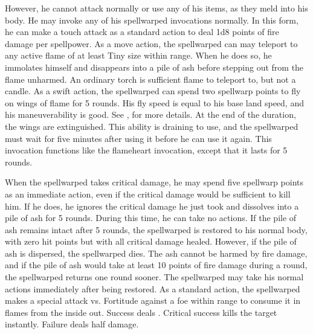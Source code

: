 However, he cannot attack normally or use any of his items, as they meld into his body.
He may invoke any of his spellwarped invocations normally.
In this form, he can make a touch attack as a standard action to deal 1d8 points of fire damage per spellpower.
As a move action, the spellwarped can may teleport to any active flame of at least Tiny size within \rngmed range.
When he does so, he immolates himself and disappears into a pile of ash before stepping out from the flame unharmed.
An ordinary torch is sufficient flame to teleport to, but not a candle.
As a swift action, the spellwarped can spend two spellwarp points to fly on wings of flame for 5 rounds.
His fly speed is equal to his base land speed, and his maneuverability is good.
See , for more details.
At the end of the duration, the wings are extinguished.
This ability is draining to use, and the spellwarped must wait for five minutes after using it before he can use it again.
This invocation functions like the flameheart invocation, except that it lasts for 5 rounds.

When the spellwarped takes critical damage, he may spend five spellwarp points as an immediate action, even if the critical damage would be sufficient to kill him.
If he does, he ignores the critical damage he just took and dissolves into a pile of ash for 5 rounds.
During this time, he can take no actions.
If the pile of ash remains intact after 5 rounds, the spellwarped is restored to his normal body, with zero hit points but with all critical damage healed.
However, if the pile of ash is dispersed, the spellwarped dies.
The ash cannot be harmed by fire damage, and if the pile of ash would take at least 10 points of fire damage during a round, the spellwarped returns one round sooner.
The spellwarped may take his normal actions immediately after being restored.
As a standard action, the spellwarped makes a special attack vs. Fortitude against a foe within \rngclose range to consume it in flames from the inside out.
Success deals .
Critical success kills the target instantly.
Failure deals half damage.

